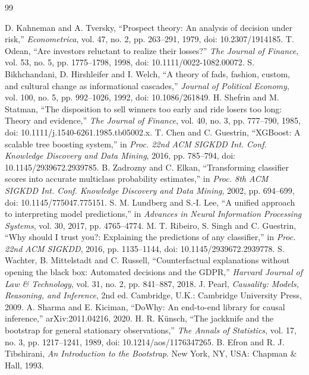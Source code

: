 \begin{thebibliography}{99}
\raggedright
{}
 D. Kahneman and A. Tversky, ``Prospect theory: An analysis of decision under risk,'' \textit{Econometrica}, vol. 47, no. 2, pp. 263--291, 1979, doi: 10.2307/1914185.
 T. Odean, ``Are investors reluctant to realize their losses?'' \textit{The Journal of Finance}, vol. 53, no. 5, pp. 1775--1798, 1998, doi: 10.1111/0022-1082.00072.
 S. Bikhchandani, D. Hirshleifer and I. Welch, ``A theory of fads, fashion, custom, and cultural change as informational cascades,'' \textit{Journal of Political Economy}, vol. 100, no. 5, pp. 992--1026, 1992, doi: 10.1086/261849.
 H. Shefrin and M. Statman, ``The disposition to sell winners too early and ride losers too long: Theory and evidence,'' \textit{The Journal of Finance}, vol. 40, no. 3, pp. 777--790, 1985, doi: 10.1111/j.1540-6261.1985.tb05002.x.
 T. Chen and C. Guestrin, ``XGBoost: A scalable tree boosting system,'' in \textit{Proc. 22nd ACM SIGKDD Int. Conf. Knowledge Discovery and Data Mining}, 2016, pp. 785--794, doi: 10.1145/2939672.2939785.
 B. Zadrozny and C. Elkan, ``Transforming classifier scores into accurate multiclass probability estimates,'' in \textit{Proc. 8th ACM SIGKDD Int. Conf. Knowledge Discovery and Data Mining}, 2002, pp. 694--699, doi: 10.1145/775047.775151.
 S. M. Lundberg and S.-I. Lee, ``A unified approach to interpreting model predictions,'' in \textit{Advances in Neural Information Processing Systems}, vol. 30, 2017, pp. 4765--4774.
 M. T. Ribeiro, S. Singh and C. Guestrin, ``Why should I trust you?: Explaining the predictions of any classifier,'' in \textit{Proc. 22nd ACM SIGKDD}, 2016, pp. 1135--1144, doi: 10.1145/2939672.2939778.
 S. Wachter, B. Mittelstadt and C. Russell, ``Counterfactual explanations without opening the black box: Automated decisions and the GDPR,'' \textit{Harvard Journal of Law \& Technology}, vol. 31, no. 2, pp. 841--887, 2018.
 J. Pearl, \textit{Causality: Models, Reasoning, and Inference}, 2nd ed. Cambridge, U.K.: Cambridge University Press, 2009.
 A. Sharma and E. Kiciman, ``DoWhy: An end-to-end library for causal inference,'' arXiv:2011.04216, 2020.
 H. R. Künsch, ``The jackknife and the bootstrap for general stationary observations,'' \textit{The Annals of Statistics}, vol. 17, no. 3, pp. 1217--1241, 1989, doi: 10.1214/aos/1176347265.
 B. Efron and R. J. Tibshirani, \textit{An Introduction to the Bootstrap}. New York, NY, USA: Chapman \& Hall, 1993.

\end{thebibliography}
